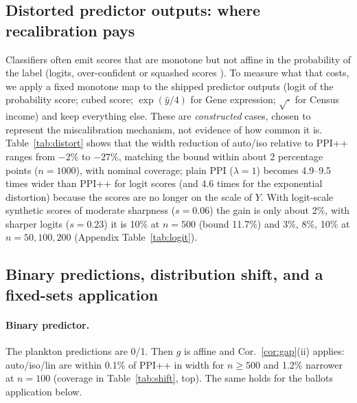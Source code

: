 \subsection{Distorted predictor outputs: where recalibration pays}\label{sec:exp-distort}
Classifiers often emit scores that are monotone but not affine in the probability of the label (logits, over-confident or squashed scores \citealp{niculescu2005predicting,guo2017calibration}). To measure what that costs, we apply a fixed monotone map to the shipped predictor outputs (logit of the probability score; cubed score; $\exp(\hat y/4)$ for Gene expression; $\sqrt{\cdot}$ for Census income) and keep everything else. These are \emph{constructed} cases, chosen to represent the miscalibration mechanism, not evidence of how common it is. Table~\ref{tab:distort} shows that the width reduction of auto/iso relative to PPI++ ranges from $-2\%$ to $-27\%$, matching the bound within about 2 percentage points ($n=1000$), with nominal coverage; plain PPI ($\lambda{=}1$) becomes 4.9--9.5 times wider than PPI++ for logit scores (and 4.6 times for the exponential distortion) because the scores are no longer on the scale of $Y$. With logit-scale synthetic scores of moderate sharpness ($s=0.06$) the gain is only about 2\%, with sharper logits ($s=0.23$) it is 10\% at $n=500$ (bound 11.7\%) and 3\%, 8\%, 10\% at $n=50,100,200$ (Appendix Table~\ref{tab:logit}).

\begin{table}[t]\centering\small
\caption{Monotonically distorted predictor outputs, $n=1000$, $N=20{,}000$, 1000 replicates. Width ratios to PPI++ with unclipped $\hat\lambda$. The last column is the ratio of ppi\_py's clipped PPI++ to the unclipped one.}\label{tab:distort}
\resizebox{\linewidth}{!}{}
\end{table}

\subsection{Binary predictions, distribution shift, and a fixed-sets application}\label{sec:exp-shift}
\paragraph{Binary predictor.} The plankton predictions are 0/1. Then $g$ is affine and Cor.~\ref{cor:gap}(ii) applies: auto/iso/lin are within 0.1\% of PPI++ in width for $n\ge500$ and 1.2\% narrower at $n=100$ (coverage in Table~\ref{tab:shift}, top). The same holds for the ballots application below.
